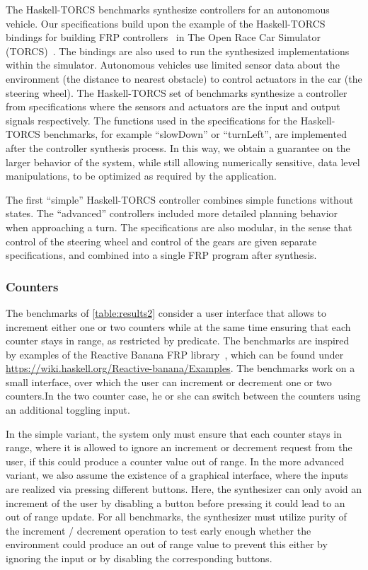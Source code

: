 The Haskell-TORCS benchmarks synthesize controllers for an autonomous vehicle.
Our specifications build upon the example of the Haskell-TORCS bindings for building FRP controllers~\cite{SCAV2017} in The Open Race Car Simulator (TORCS)~\cite{torcs}. The bindings are also used to run the synthesized implementations within the simulator.
Autonomous vehicles use limited sensor data about the environment (\eg the distance to nearest obstacle) to control actuators in the car (\eg the steering wheel).
The Haskell-TORCS set of benchmarks synthesize a controller from \TSL specifications where the sensors and actuators are the input and output signals respectively.
The functions used in the \TSL specifications for the Haskell-TORCS benchmarks, for example ``slowDown'' or ``turnLeft'', are implemented after the controller synthesis process.
In this way, we obtain a guarantee on the larger behavior of the system, while still allowing numerically sensitive, data level manipulations, to be optimized as required by the application.

The first ``simple'' Haskell-TORCS controller combines simple functions without states.
The ``advanced'' controllers included more detailed planning behavior when approaching a turn.
The specifications are also modular, in the sense that control of the steering wheel and control of the gears are given separate specifications, and combined into a single FRP program after synthesis.

\subsubsection{Counters}

The benchmarks of \cref{table:results2} consider a user interface that
allows to increment either one or two counters while at the same time
ensuring that each counter stays in range, as restricted by
predicate. The benchmarks are inspired by examples of the Reactive
Banana FRP library~\cite{reactivebanana}, which can be found under
\url{https://wiki.haskell.org/Reactive-banana/Examples}. The
benchmarks work on a small interface, over which the user can
increment or decrement one or two counters.In the two counter case,
he or she can switch between the counters using an additional toggling
input.

In the simple variant, the system only must ensure that each counter
stays in range, where it is allowed to ignore an increment or
decrement request from the user, if this could produce a counter value
out of range. In the more advanced variant, we also assume the
existence of a graphical interface, where the inputs are realized via
pressing different buttons. Here, the synthesizer can only avoid an
increment of the user by disabling a button before pressing it could
lead to an out of range update. For all benchmarks, the synthesizer
must utilize purity of the increment / decrement operation to test
early enough whether the environment could produce an out of range
value to prevent this either by ignoring the input or by disabling the
corresponding buttons.
